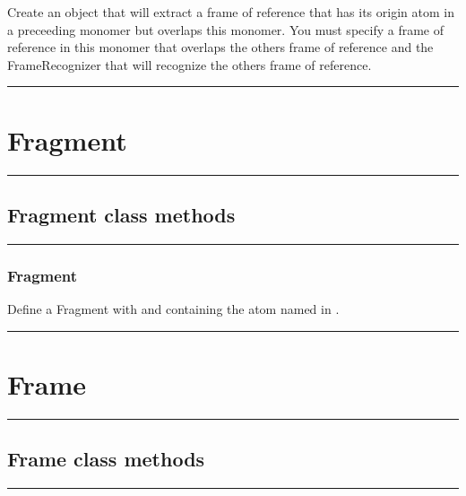 \begin{itemize}
Create an object that will extract a frame of reference that has its
origin atom in a preceeding monomer but overlaps this monomer.  
You must specify a frame of reference in this monomer  that overlaps the
others frame of reference and the FrameRecognizer that will recognize the others frame
of reference.

\rule{6in}{0.01cm}\par
{}\par
\section{Fragment}
\rule{6in}{0.01cm}\par
{}\par
\subsection{Fragment class methods}
\rule{6in}{0.01cm}\par
{}\par
\subsubsection{Fragment}

Define a Fragment with  and containing the atom named in .


\rule{6in}{0.01cm}\par
{}\par
\section{Frame}
\rule{6in}{0.01cm}\par
{}\par
\subsection{Frame class methods}
\rule{6in}{0.01cm}\par
{}\par

\end{itemize}
